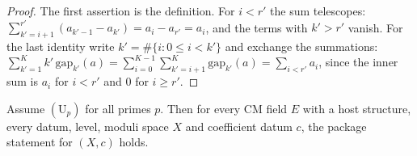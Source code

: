 \begin{proof}
The first assertion is the definition. For $i<r'$ the sum telescopes: $\sum_{k'=i+1}^{r'}(a_{k'-1}-a_{k'})=a_i-a_{r'}=a_i$, and the terms
with $k'>r'$ vanish. For the last identity write $k'=\#\{i:0\le i<k'\}$ and exchange the summations:
$\sum_{k'=1}^K k'\,\mathrm{gap}_{k'}(a)=\sum_{i=0}^{K-1}\sum_{k'=i+1}^{K}\mathrm{gap}_{k'}(a)=\sum_{i<r'}a_i$, since the inner sum is $a_i$
for $i<r'$ and $0$ for $i\ge r'$.
\end{proof}

\begin{theorem}\label{pf:onto2:packages}
Assume $(\mathrm U_p)$ for all primes $p$. Then for every CM field $E$ with a host structure, every datum, level, moduli space $X$ and
coefficient datum $c$, the package statement for $(X,c)$ holds.
\end{theorem}

